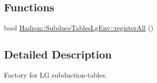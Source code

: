 \subsection*{Functions}
\begin{DoxyCompactItemize}
\item 
bool \mbox{\hyperlink{namespaceHadron_1_1SubduceTablesLgEnv_abb63f9dacfb5b881f3052ce08000b859}{Hadron\+::\+Subduce\+Tables\+Lg\+Env\+::register\+All}} ()
\end{DoxyCompactItemize}


\subsection{Detailed Description}
Factory for LG subduction-\/tables. 

